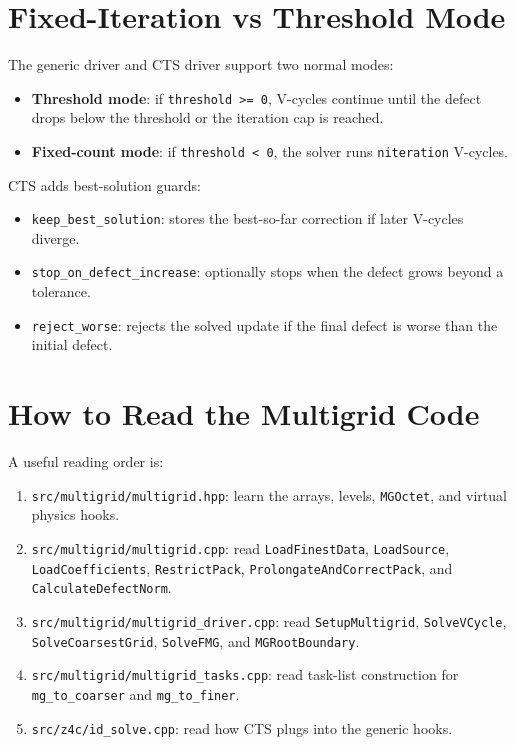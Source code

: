 \documentclass[11pt]{article}
\newcommand{\file}[1]{\nolinkurl{#1}}
\newcommand{\code}[1]{\texttt{#1}}
\begin{document}
\section{Fixed-Iteration vs Threshold Mode}

The generic driver and CTS driver support two normal modes:

\begin{itemize}
  \item \textbf{Threshold mode}: if \code{threshold >= 0}, V-cycles continue until
        the defect drops below the threshold or the iteration cap is reached.
  \item \textbf{Fixed-count mode}: if \code{threshold < 0}, the solver runs
        \code{niteration} V-cycles.
\end{itemize}

CTS adds best-solution guards:
\begin{itemize}
  \item \code{keep\_best\_solution}: stores the best-so-far correction if later
        V-cycles diverge.
  \item \code{stop\_on\_defect\_increase}: optionally stops when the defect grows
        beyond a tolerance.
  \item \code{reject\_worse}: rejects the solved update if the final defect is
        worse than the initial defect.
\end{itemize}

\section{How to Read the Multigrid Code}

A useful reading order is:
\begin{enumerate}
  \item \file{src/multigrid/multigrid.hpp}: learn the arrays, levels, \code{MGOctet},
        and virtual physics hooks.
  \item \file{src/multigrid/multigrid.cpp}: read \code{LoadFinestData},
        \code{LoadSource}, \code{LoadCoefficients}, \code{RestrictPack},
        \code{ProlongateAndCorrectPack}, and \code{CalculateDefectNorm}.
  \item \file{src/multigrid/multigrid\_driver.cpp}: read \code{SetupMultigrid},
        \code{SolveVCycle}, \code{SolveCoarsestGrid}, \code{SolveFMG}, and
        \code{MGRootBoundary}.
  \item \file{src/multigrid/multigrid\_tasks.cpp}: read task-list construction
        for \code{mg\_to\_coarser} and \code{mg\_to\_finer}.
  \item \file{src/z4c/id\_solve.cpp}: read how CTS plugs into the generic hooks.
\end{enumerate}
\end{document}
